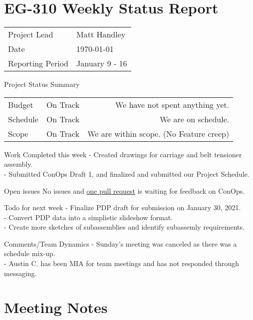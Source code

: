 \documentclass{scrartcl}
\begin{document}
\section*{EG-310 Weekly Status Report}
\begin{center}
    \begin{tabular}{ l l }
        Project Lead     & Matt Handley          \\
        Date             & \today         \\
        Reporting Period & January 9 - 16
    \end{tabular}
\end{center}

\begin{defi}{Project Status Summary}{}
    \begin{tabular}{ l l r }
        Budget   & On Track & We have not spent anything yet.         \\
        Schedule & On Track & We are on schedule.                     \\
        Scope    & On Track & We are within scope. (No Feature creep)
    \end{tabular}
\end{defi}

\begin{defi}{Work Completed this week}{}
    - Created drawings for carriage and belt tensioner assembly. \\
    - Submitted ConOps Draft 1, and finalized and submitted our Project Schedule.
\end{defi}

\begin{defi}{Open issues}{}
    No issues and \href{https://github.com/KenwoodFox/EG-310-InvertedPendulum/pull/7}{one pull request} is waiting for feedback on ConOps.
\end{defi}

\begin{defi}{Todo for next week}{}
    - Finalize PDP draft for submission on January 30, 2021.  \\ 
    - Convert PDP data into a simplistic slideshow format. \\
    - Create more sketches of subassemblies and identify subassemly requirements.
\end{defi}

\begin{defi}{Comments/Team Dynamics}{}
    - Sunday's meeting was canceled as there was a schedule mix-up. \\
    - Austin C. has been MIA for team meetings and has not responded through messaging.
\end{defi}


\pagebreak
\section{Meeting Notes}

\end{document}
